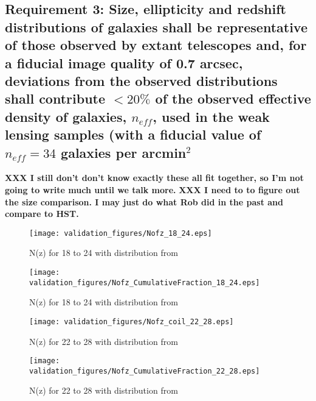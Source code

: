 \documentclass[]{article}
\begin{document}
\subsection{Requirement 3: Size, ellipticity and redshift distributions of galaxies shall be representative of those observed by extant
telescopes and, for a fiducial image quality of 0.7 arcsec, deviations from the observed distributions shall
contribute $< 20\%$ of the observed effective density of galaxies, $n_{eff}$, used in the weak lensing samples (with a fiducial value of
$n_{eff} = 34$ galaxies per arcmin$^2$}
{\bf XXX I still don't don't know exactly these all fit together, so I'm not going to write much until we talk more.}
{\bf XXX I need to to figure out the size comparison.  I may just do what Rob did in the past and compare to HST.}
\begin{figure}
\centering
\texttt{[image: validation\_figures/Nofz\_18\_24.eps]}
\caption{N(z) for 18 to 24 with distribution from \cite{coil}\label{fig:nofz18_24}}
\end{figure}
\begin{figure}
\centering
\texttt{[image: validation\_figures/Nofz\_CumulativeFraction\_18\_24.eps]}
\caption{N(z) for 18 to 24 with distribution from \cite{coil}\label{fig:nofz18_24_ratio}}
\end{figure}
\begin{figure}
\centering
\texttt{[image: validation\_figures/Nofz\_coil\_22\_28.eps]}
\caption{N(z) for 22 to 28 with distribution from \cite{coil}\label{fig:nofz22_28}}
\end{figure}
\begin{figure}
\centering
\texttt{[image: validation\_figures/Nofz\_CumulativeFraction\_22\_28.eps]}
\caption{N(z) for 22 to 28 with distribution from \cite{coil}\label{fig:nofz22_28_ratio}}
\end{figure}
\end{document}
